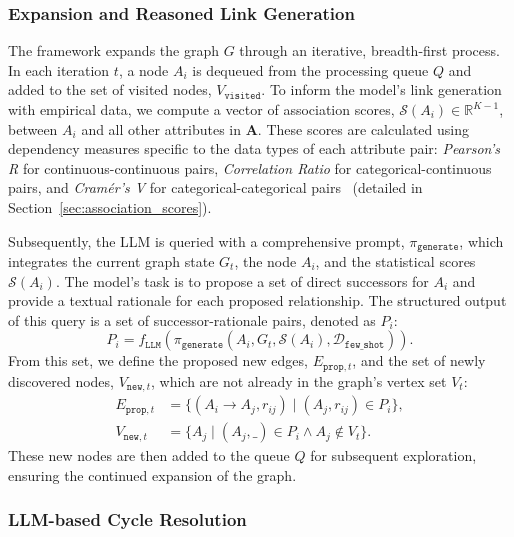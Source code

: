 \subsubsection{Expansion and Reasoned Link Generation}

The framework expands the graph $G$ through an iterative, breadth-first process. In each iteration $t$, a node $A_i$ is dequeued from the processing queue $Q$ and added to the set of visited nodes, $V_{\mathtt{visited}}$. To inform the model's link generation with empirical data, we compute a vector of association scores, $\mathcal{S}(A_i) \in \mathbb{R}^{K-1}$, between $A_i$ and all other attributes in $\mathbf{A}$. These scores are calculated using dependency measures specific to the data types of each attribute pair: \textit{Pearson's R} for continuous-continuous pairs, \textit{Correlation Ratio} for categorical-continuous pairs, and \textit{Cramér's V} for categorical-categorical pairs~\cite{agresti2011categorical} (detailed in Section~\ref{sec:association_scores}).

Subsequently, the LLM is queried with a comprehensive prompt, $\pi_{\mathtt{generate}}$, which integrates the current graph state $G_t$, the node $A_i$, and the statistical scores $\mathcal{S}(A_i)$. The model's task is to propose a set of direct successors for $A_i$ and provide a textual rationale for each proposed relationship. The structured output of this query is a set of successor-rationale pairs, denoted as $P_i$:
\begin{equation}
    P_i = f_{\mathtt{LLM}}(\pi_{\mathtt{generate}}(A_i, G_t, \mathcal{S}(A_i), \mathcal{D}_{\mathtt{few\_shot}})).
\end{equation}
From this set, we define the proposed new edges, $E_{\mathtt{prop}, t}$, and the set of newly discovered nodes, $V_{\mathtt{new}, t}$, which are not already in the graph's vertex set $V_t$:
\begin{equation}
    \begin{aligned}
        E_{\mathtt{prop}, t} &= \{ (A_i \to A_j, r_{ij}) \mid (A_j, r_{ij}) \in P_i \}, \\
        V_{\mathtt{new}, t} &= \{ A_j \mid (A_j, \_) \in P_i \land A_j \notin V_t \}.
    \end{aligned}
\end{equation}
These new nodes are then added to the queue $Q$ for subsequent exploration, ensuring the continued expansion of the graph.%

\subsubsection{LLM-based Cycle Resolution}

